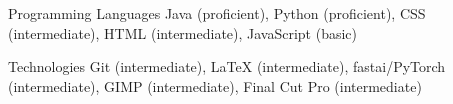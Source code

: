 


\begin{cvskills}


\cvskill
{Programming Languages} %
{Java (proficient), Python (proficient), CSS (intermediate), HTML (intermediate), JavaScript (basic)} %



\cvskill
{Technologies} %
{Git (intermediate), \textrm{\LaTeX} (intermediate),
fastai/PyTorch (intermediate), GIMP (intermediate), Final Cut Pro (intermediate)} %





\end{cvskills}